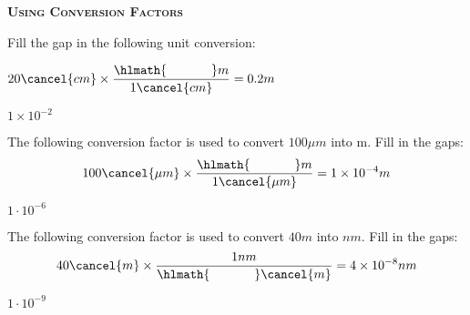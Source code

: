\documentclass[main.tex]{subfiles}
\begin{document}
\begin{multicols*}{2}
{\raggedright\textsc{\textbf{Using Conversion Factors }}\par}

\begin{question}[ID=\the\value{numA}]
Fill the gap in the following unit conversion:
\begin{center}$20\cancel{cm} \times \dfrac{ \hlmath{\hspace{35pt}}m }{1\cancel{cm}}=0.2m$\end{center}
\end{question}
\begin{solution}
$1\times 10^{-2}$
\hspace{0.1cm}\end{solution}%


\begin{question}[ID=\the\value{numA}]
The following conversion factor is used to convert $100\mu m$ into m. Fill in the gaps:
\[100\cancel{\mu m} \times \dfrac{\hlmath{\hspace{35pt}}m}{1\cancel{\mu m}}=1\times 10^{-4}m\]
\end{question}
\begin{solution}
$1\cdot 10^{-6}$
\hspace{0.1cm}\end{solution}%


\begin{question}[ID=\the\value{numA}]
The following conversion factor is used to convert $40 m$ into $nm$. Fill in the gaps:
\[40\cancel{ m} \times \dfrac{  1   nm}{\hlmath{\hspace{35pt}} \cancel{ m}}=4\times 10^{-8}nm\]
\end{question}
\begin{solution}
$1\cdot 10^{-9}$
\hspace{0.1cm}\end{solution}%


\end{multicols*}
\end{document}
